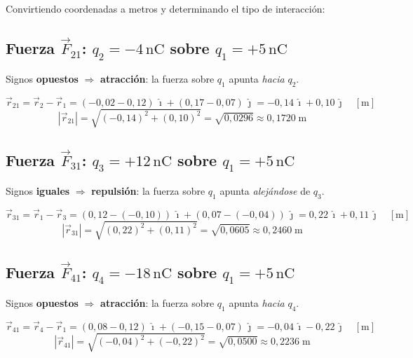 \documentclass[12pt,letterpaper]{article}
\begin{document}
Convirtiendo coordenadas a metros y determinando el tipo de interacci\'on:

\subsection*{Fuerza $\vec{F}_{21}$: $q_2 = -4\,\text{nC}$ sobre $q_1 = +5\,\text{nC}$}

Signos \textbf{opuestos} $\Rightarrow$ \textbf{atracci\'on}: la fuerza sobre $q_1$ apunta \emph{hacia} $q_2$.

\begin{equation*}
\vec{r}_{21} = \vec{r}_2 - \vec{r}_1
= (-0{,}02 - 0{,}12)\,\hat{\imath} + (0{,}17 - 0{,}07)\,\hat{\jmath}
= -0{,}14\,\hat{\imath} + 0{,}10\,\hat{\jmath}\quad[\text{m}]
\end{equation*}
\begin{equation*}
|\vec{r}_{21}| = \sqrt{(-0{,}14)^2 + (0{,}10)^2} = \sqrt{0{,}0296} \approx 0{,}1720\;\text{m}
\end{equation*}

\subsection*{Fuerza $\vec{F}_{31}$: $q_3 = +12\,\text{nC}$ sobre $q_1 = +5\,\text{nC}$}

Signos \textbf{iguales} $\Rightarrow$ \textbf{repulsi\'on}: la fuerza sobre $q_1$ apunta \emph{alejándose} de $q_3$.

\begin{equation*}
\vec{r}_{31} = \vec{r}_1 - \vec{r}_3
= (0{,}12 - (-0{,}10))\,\hat{\imath} + (0{,}07 - (-0{,}04))\,\hat{\jmath}
= 0{,}22\,\hat{\imath} + 0{,}11\,\hat{\jmath}\quad[\text{m}]
\end{equation*}
\begin{equation*}
|\vec{r}_{31}| = \sqrt{(0{,}22)^2 + (0{,}11)^2} = \sqrt{0{,}0605} \approx 0{,}2460\;\text{m}
\end{equation*}

\subsection*{Fuerza $\vec{F}_{41}$: $q_4 = -18\,\text{nC}$ sobre $q_1 = +5\,\text{nC}$}

Signos \textbf{opuestos} $\Rightarrow$ \textbf{atracci\'on}: la fuerza sobre $q_1$ apunta \emph{hacia} $q_4$.

\begin{equation*}
\vec{r}_{41} = \vec{r}_4 - \vec{r}_1
= (0{,}08 - 0{,}12)\,\hat{\imath} + (-0{,}15 - 0{,}07)\,\hat{\jmath}
= -0{,}04\,\hat{\imath} - 0{,}22\,\hat{\jmath}\quad[\text{m}]
\end{equation*}
\begin{equation*}
|\vec{r}_{41}| = \sqrt{(-0{,}04)^2 + (-0{,}22)^2} = \sqrt{0{,}0500} \approx 0{,}2236\;\text{m}
\end{equation*}
\end{document}
